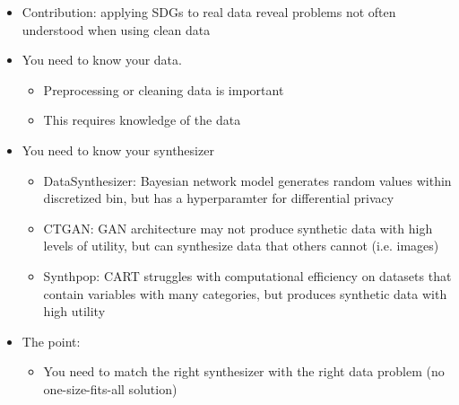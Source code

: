 \documentclass[t,8pt,utfx8]{beamer}
\begin{document}
\begin{spacing}{1.25}
{\begin{itemize}
    \item Contribution: applying SDGs to real data reveal problems not often understood when using clean data 
    \item You need to know your data.    
    \begin{itemize}
        \item Preprocessing or cleaning data is important
        \item This requires knowledge of the data
    \end{itemize}
    \item You need to know your synthesizer 
    \begin{itemize}
        \item DataSynthesizer: Bayesian network model generates random values within discretized bin, but has a hyperparamter for differential privacy 
        \item CTGAN: GAN architecture may not produce synthetic data with high levels of utility, but can synthesize data that others cannot (i.e. images)
        \item Synthpop: CART struggles with computational efficiency on datasets that contain variables with many categories, but produces synthetic data with high utility
    \end{itemize}
    \item The point: 
    \begin{itemize}
        \item You need to match the right synthesizer with the right data problem (no one-size-fits-all solution)
    \end{itemize}
\end{itemize}
}



\end{spacing}
\end{document}
